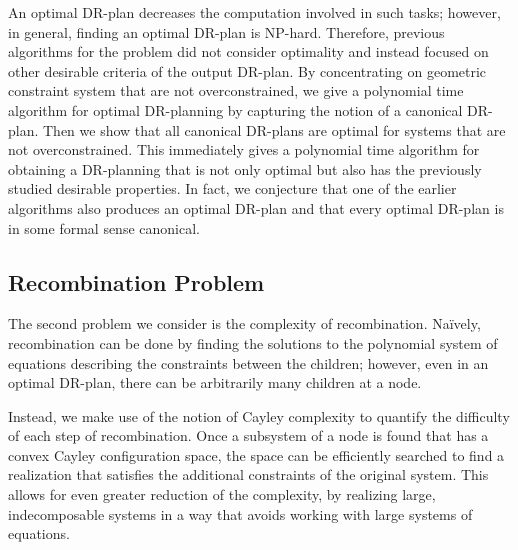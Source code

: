 An optimal DR-plan decreases the computation involved in such tasks; however, in general, finding an optimal DR-plan is NP-hard. Therefore, previous algorithms for the problem did not consider optimality and instead focused on other desirable criteria of the output DR-plan. By concentrating on geometric constraint system that are not overconstrained, we give a polynomial time algorithm for optimal DR-planning by capturing the notion of a canonical DR-plan. Then we show that all canonical DR-plans are optimal for systems that are not overconstrained. This immediately gives a polynomial time algorithm for obtaining a DR-planning that is not only optimal but also has the previously studied desirable properties. In fact, we conjecture that one of the earlier algorithms also produces an optimal DR-plan and that every optimal DR-plan is in some formal sense canonical.





\subsection{Recombination Problem}
The second problem we consider is the complexity of recombination. Na{\"i}vely, recombination can be done by finding the solutions to the polynomial system of equations describing the constraints between the children; however, even in an optimal DR-plan, there can be arbitrarily many children at a node.


Instead, we make use of the notion of Cayley complexity to quantify the difficulty of each step of recombination. Once a subsystem of a node is found that has a convex Cayley configuration space, the space can be efficiently searched to find a realization that satisfies the additional constraints of the original system.
This allows for even greater reduction of the complexity, by realizing large, indecomposable systems in a way that avoids working with large systems of equations.




